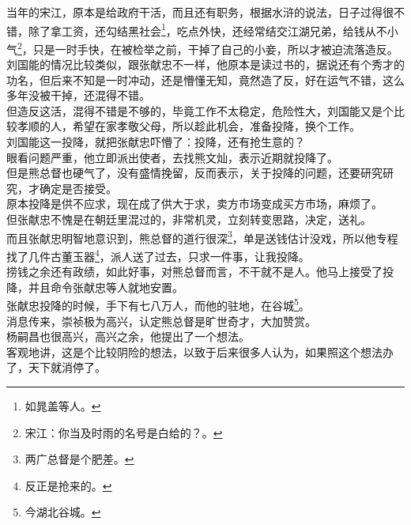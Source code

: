 \begin{multicols}{\theparacolNo}
当年的宋江，原本是给政府干活，而且还有职务，根据水浒的说法，日子过得很不错，除了拿工资，还勾结黑社会\footnote{如晁盖等人。}，吃点外快，还经常结交江湖兄弟，给钱从不小气\footnote{宋江：你当及时雨的名号是白给的？。}，只是一时手快，在被检举之前，干掉了自己的小妾，所以才被迫流落造反。\\

刘国能的情况比较类似，跟张献忠不一样，他原本是读过书的，据说还有个秀才的功名，但后来不知是一时冲动，还是懵懂无知，竟然造了反，好在运气不错，这么多年没被干掉，还混得不错。\\

但造反这活，混得不错是不够的，毕竟工作不太稳定，危险性大，刘国能又是个比较孝顺的人，希望在家孝敬父母，所以趁此机会，准备投降，换个工作。\\

刘国能这一投降，就把张献忠吓懵了：投降，还有抢生意的？\\

眼看问题严重，他立即派出使者，去找熊文灿，表示近期就投降了。\\

但是熊总督也硬气了，没有盛情挽留，反而表示，关于投降的问题，还要研究研究，才确定是否接受。\\

原本投降是供不应求，现在成了供大于求，卖方市场变成买方市场，麻烦了。\\

但张献忠不愧是在朝廷里混过的，非常机灵，立刻转变思路，决定，送礼。\\

而且张献忠明智地意识到，熊总督的道行很深\footnote{两广总督是个肥差。}，单是送钱估计没戏，所以他专程找了几件古董玉器\footnote{反正是抢来的。}，派人送了过去，只求一件事，让我投降。\\

捞钱之余还有政绩，如此好事，对熊总督而言，不干就不是人。他马上接受了投降，并且命令张献忠等人就地安置。\\

张献忠投降的时候，手下有七八万人，而他的驻地，在谷城\footnote{今湖北谷城。}。\\

消息传来，崇祯极为高兴，认定熊总督是旷世奇才，大加赞赏。\\

杨嗣昌也很高兴，高兴之余，他提出了一个想法。\\

客观地讲，这是个比较阴险的想法，以致于后来很多人认为，如果照这个想法办了，天下就消停了。\\


\end{multicols}
